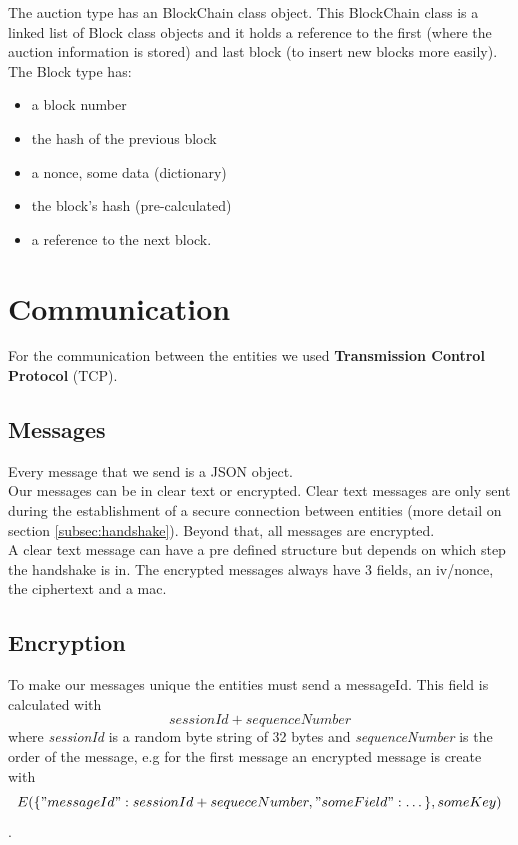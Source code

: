 \documentclass[12pt]{article}
\begin{document}
The auction type has an BlockChain class object. This BlockChain class is a linked list
    of Block class objects and it holds a reference to the first (where the auction
    information is stored) and last block (to insert new blocks more easily).\\ 
    The Block type has:
  \begin{itemize}
    \item a block number 
    \item the hash of the previous block
    \item a nonce, some data (dictionary)
    \item the block's hash (pre-calculated) 
    \item a reference to the next block.
  \end{itemize}

\section{Communication}

For the communication between the entities we used \textbf{Transmission Control Protocol} (TCP).

\subsection{Messages}
Every message that we send is a JSON object. \\
Our messages can be in clear text or encrypted. Clear text messages are only sent during
  the establishment of a secure connection between entities (more detail on section \ref{subsec:handshake}).
  Beyond that, all messages are encrypted. \\
A clear text message can have a pre defined structure but depends on which step the handshake is in. 
  The encrypted messages always have 3 fields, an iv/nonce, the ciphertext and a mac.

\subsection{Encryption}
To make our messages unique the entities must send a messageId. This field is calculated with
  \[sessionId + sequenceNumber\] where \textit{sessionId} is a random byte string of 32 bytes and \textit{sequenceNumber}
  is the order of the message, e.g for the first message an encrypted message is create with
  \[E(\{"messageId":sessionId+sequeceNumber, "someField":\dots\}, someKey)\]. \\
\end{document}
